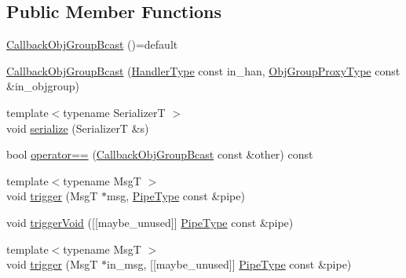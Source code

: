 \subsection*{Public Member Functions}
\begin{DoxyCompactItemize}
\item 
\hyperlink{structvt_1_1pipe_1_1callback_1_1_callback_obj_group_bcast_a8561b655015ff3b5babf80e95f224727}{Callback\+Obj\+Group\+Bcast} ()=default
\item 
\hyperlink{structvt_1_1pipe_1_1callback_1_1_callback_obj_group_bcast_ae7943e2d45503a44de66ec6f6e298cd5}{Callback\+Obj\+Group\+Bcast} (\hyperlink{namespacevt_af64846b57dfcaf104da3ef6967917573}{Handler\+Type} const in\+\_\+han, \hyperlink{namespacevt_ad7cae989df485fccca57f0792a880a8e}{Obj\+Group\+Proxy\+Type} const \&in\+\_\+objgroup)
\item 
{\footnotesize template$<$typename SerializerT $>$ }\\void \hyperlink{structvt_1_1pipe_1_1callback_1_1_callback_obj_group_bcast_aa54227732bb00239a126c34c78aba5fb}{serialize} (SerializerT \&s)
\item 
bool \hyperlink{structvt_1_1pipe_1_1callback_1_1_callback_obj_group_bcast_a45c2e760843a416992e2a85c265136c7}{operator==} (\hyperlink{structvt_1_1pipe_1_1callback_1_1_callback_obj_group_bcast}{Callback\+Obj\+Group\+Bcast} const \&other) const
\item 
{\footnotesize template$<$typename MsgT $>$ }\\void \hyperlink{structvt_1_1pipe_1_1callback_1_1_callback_obj_group_bcast_aa39774bf2c1e2eeebf19339ad06253c8}{trigger} (MsgT $\ast$msg, \hyperlink{namespacevt_ac9852acda74d1896f48f406cd72c7bd3}{Pipe\+Type} const \&pipe)
\item 
void \hyperlink{structvt_1_1pipe_1_1callback_1_1_callback_obj_group_bcast_a250a4f8a9f8ce2d27f53f05426f2c0b4}{trigger\+Void} (\mbox{[}\mbox{[}maybe\+\_\+unused\mbox{]}\mbox{]} \hyperlink{namespacevt_ac9852acda74d1896f48f406cd72c7bd3}{Pipe\+Type} const \&pipe)
\item 
{\footnotesize template$<$typename MsgT $>$ }\\void \hyperlink{structvt_1_1pipe_1_1callback_1_1_callback_obj_group_bcast_a9078feda0000a80ba005caaded07a03c}{trigger} (MsgT $\ast$in\+\_\+msg, \mbox{[}\mbox{[}maybe\+\_\+unused\mbox{]}\mbox{]} \hyperlink{namespacevt_ac9852acda74d1896f48f406cd72c7bd3}{Pipe\+Type} const \&pipe)
\end{DoxyCompactItemize}
